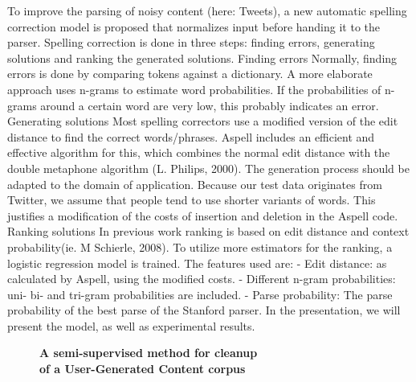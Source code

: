\documentclass[10pt, a4paper, twopage, headinclude, footinclude, BCOR5mm]{book}
\begin{document}
\begin{table}[t!]
\end{table} 
\noindent
To improve the parsing of noisy content (here: Tweets), a new automatic spelling correction model is proposed that normalizes input before handing it to the parser. Spelling correction is done in three steps: finding errors, generating solutions and ranking the generated solutions.  Finding errors Normally, finding errors is done by comparing tokens against a dictionary. A more elaborate  approach uses n-grams to estimate word probabilities. If the probabilities of n-grams around a certain word are very low, this probably indicates an error.  Generating solutions Most spelling correctors use a modified version of the edit distance to find the correct words/phrases. Aspell includes an efficient and effective algorithm for this, which combines the normal edit distance with the double metaphone algorithm (L. Philips, 2000). The generation process should be adapted to the domain of application. Because our test data originates from Twitter, we assume that people tend to use shorter variants of words. This justifies a modification of the costs of insertion and deletion in the Aspell code.  Ranking solutions In previous work ranking is based on edit distance and context probability(ie. M Schierle, 2008). To utilize more estimators for the ranking, a logistic regression model is trained. The features used are:  - Edit distance: as calculated by Aspell, using the modified costs. - Different n-gram probabilities: uni- bi- and tri-gram probabilities are included. - Parse probability: The parse probability of the best parse of the Stanford parser.  In the presentation, we will present the model, as well as experimental results.  

\newpage

\begin{figure}[t!]
\centering
\large\textbf{A semi-supervised method for cleanup \\ of a User-Generated Content corpus}
\vspace*{0.5cm}
\end{figure}
\end{document}
